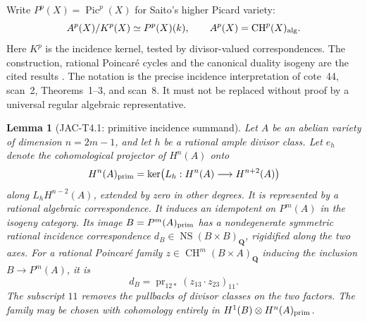 \documentclass[11pt,a4paper]{article}
\newtheorem{lemma}[theorem]{Lemma}
\begin{document}
Write $P^p(X)=\operatorname{Pic}^p(X)$ for Saito's higher Picard variety:
\[
 A^p(X)/K^p(X)\simeq P^p(X)(k),\qquad
 A^p(X)=\operatorname{CH}^p(X)_{\rm alg}.
\]
Here $K^p$ is the incidence kernel, tested by divisor-valued
correspondences. The construction, rational Poincar\'e cycles and the
canonical duality isogeny are the cited results
\cite[Theorem~3.6, \S4.1, Proposition~4.4]{Saito1979}.
The notation is the precise incidence interpretation of cote~44,
scan~2, Theorems~1--3, and scan~8. It must not be replaced without proof
by a universal regular algebraic representative.

\begin{lemma}[JAC-T4.1: primitive incidence summand]
\label{lem:primitive-summand}
Let $A$ be an abelian variety of dimension $n=2m-1$, and let $h$ be a
rational ample divisor class. Let $e_h$ denote the cohomological projector
of $H^n(A)$ onto
\[
 H^n(A)_{\rm prim}=\ker\bigl(L_h:H^n(A)\longrightarrow H^{n+2}(A)\bigr)
\]
along $L_hH^{n-2}(A)$, extended by zero in other degrees.
It is represented by a rational algebraic correspondence. It induces an
idempotent on $P^m(A)$ in the isogeny category. Its image $B=P^m(A)_{\rm prim}$
has a nondegenerate symmetric rational incidence correspondence
$d_B\in\operatorname{NS}(B\times B)_{\mathbf Q}$, rigidified along the two
axes. For a rational Poincar\'e family $z\in\operatorname{CH}^m(B\times A)_{\mathbf Q}$
inducing the inclusion $B\longrightarrow P^m(A)$, it is
\begin{equation}\label{eq:incidence}
 d_B=\operatorname{pr}_{12*}(z_{13}\cdot z_{23})_{11}.
\end{equation}
The subscript $11$ removes the pullbacks of divisor classes on the two
factors. The family may be chosen with cohomology entirely in
$H^1(B)\otimes H^n(A)_{\rm prim}$.
\end{lemma}
\end{document}
